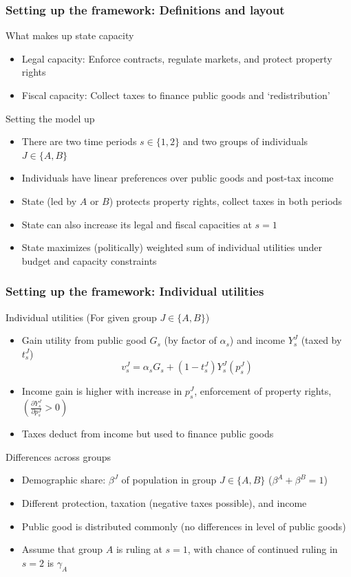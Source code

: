 \documentclass[aspectratio=169]{beamer}
\begin{document}
\begin{frame}
\frametitle{Setting up the framework: Definitions and layout} 
What makes up state capacity
\begin{itemize}\setlength\itemsep{3pt}
\item Legal capacity: Enforce contracts, regulate markets, and protect property rights
\item Fiscal capacity: Collect taxes to finance public goods and `redistribution'
\end{itemize}\medskip 
Setting the model up
\begin{itemize}
\item There are two time periods $s\in\{1,2\}$ and two groups of individuals  $J\in\{A,B\}$
\item Individuals have linear preferences over public goods and post-tax income
\item State (led by $A$ or $B$) protects property rights, collect taxes in both periods
\item State can also increase its legal and fiscal capacities at $s=1$
\item State maximizes (politically) weighted sum of individual utilities under budget and capacity constraints
\end{itemize}
\end{frame}

\begin{frame}
\frametitle{Setting up the framework: Individual utilities} 
Individual utilities (For given group $J\in\{A,B\}$)
\begin{itemize}\setlength\itemsep{3pt}
\item Gain utility from public good $G_s$ (by factor of $\alpha_s$) and income $Y_s^J$ (taxed by $t_s^J$)
\[
v_s^J=\alpha_s G_s + (1-t_s^J)Y_s^J(p_s^J) 
\]\vspace{-20pt}
\item Income gain is higher with increase in $p_s^J$, enforcement of property rights, $\left(\frac{\partial Y_s^J}{\partial p_s^J} >0\right)$
\item Taxes deduct from income but used to finance public goods
\end{itemize}\medskip 
Differences across groups
\begin{itemize}\setlength\itemsep{3pt}
\item Demographic share: $\beta^J$ of population in group $J\in\{A,B\}$ ($\beta^A+ \beta^B=1$)
\item Different protection, taxation (negative taxes possible), and income 
\item Public good is distributed commonly (no differences in level of public goods)
\item Assume that group $A$ is ruling at $s=1$, with chance of continued ruling in $s=2$ is $\gamma_A$
\end{itemize}\medskip 

\end{frame}
\end{document}
